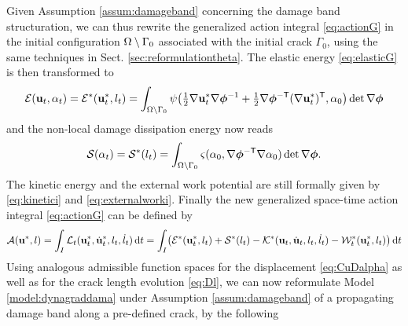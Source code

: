 Given Assumption \ref{assum:damageband} concerning the damage band structuration, we can thus rewrite the generalized action integral \eqref{eq:actionG} in the initial configuration ${\Omega\setminus\Gamma_0}$ associated with the initial crack $\Gamma_0$, using the same techniques in Sect. \ref{sec:reformulationtheta}. The elastic energy \eqref{eq:elasticG} is then transformed to
\begin{equation} \label{eq:elasticGi}
\mathcal{E}(\vec{u}_t,\alpha_t)=\mathcal{E}^*(\vec{u}_t^*,l_t)=\int_\domaini\psi\bigl({\textstyle\frac{1}{2}}\nabla\vec{u}_t^*\nabla\philt^{-1}+{\textstyle\frac{1}{2}}\nabla\philt^{-\mathsf{T}}(\nabla\vec{u}_t^*)^\mT,\alpha_0\bigr)\det\nabla\philt
\end{equation}
and the non-local damage dissipation energy now reads
\begin{equation} \label{eq:surfacei}
\mathcal{S}(\alpha_t)=\mathcal{S}^*(l_t)=\int_\domaini\varsigma(\alpha_0,\nabla\philt^{-\mT}\nabla\alpha_0)\det\nabla\philt.
\end{equation}
The kinetic energy and the external work potential are still formally given by \eqref{eq:kinetici} and \eqref{eq:externalworki}. Finally the new generalized space-time action integral \eqref{eq:actionG} can be defined by
\begin{equation} \label{eq:actionGG}
\mathcal{A}(\vec{u}^*,l)=\int_I\mathcal{L}_t(\vec{u}^*_t,\dot{\vec{u}}^*_t,l_t,\dot{l}_t)\,\mathrm{d}t=\int_I\bigr(\mathcal{E}^*(\vec{u}^*_t,l_t)+\mathcal{S}^*(l_t)-\mathcal{K}^*(\vec{u}_t,\dot{\vec{u}}_t,l_t,\dot{l}_t)-\mathcal{W}_t^*(\vec{u}^*_t,l_t)\bigr)\D{t}
\end{equation}
Using analogous admissible function spaces for the displacement \eqref{eq:CuDalpha} as well as for the crack length evolution \eqref{eq:Dl}, we can now reformulate Model \ref{model:dynagraddama} under Assumption \ref{assum:damageband} of a propagating damage band along a pre-defined crack, by the following
